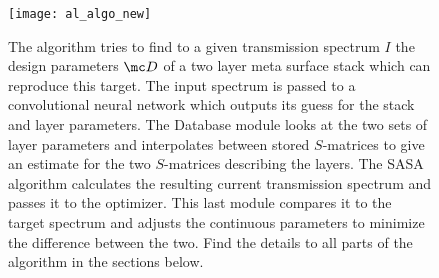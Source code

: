\begin{figure}[H]
    \centering
    \texttt{[image: al\_algo\_new]}
    \caption[]{The algorithm tries to find to a given transmission spectrum $I$ the design parameters $\mc D$ of a two layer meta surface stack which can reproduce this target. The input spectrum is passed to a convolutional neural network which outputs its guess for the stack and layer parameters. The Database module looks at the two sets of layer parameters and interpolates between stored $S$-matrices to give an estimate for the two $S$-matrices describing the layers. The SASA algorithm calculates the resulting current transmission spectrum and passes it to the optimizer. This last module compares it to the target spectrum and adjusts the continuous parameters to minimize the difference between the two. Find the details to all parts of the algorithm in the sections below.}
    \label{fig:al:algo}
\end{figure}
\vspace{0.2cm}

